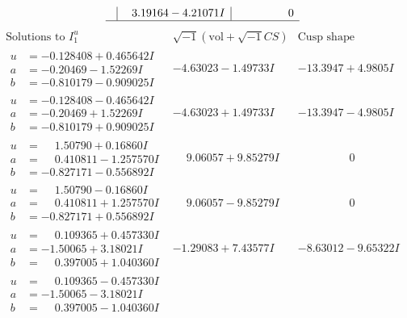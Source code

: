 \documentclass[1p]{elsarticle_modified}
\theoremstyle{definition}
\newcommand{\I}{\sqrt{-1}}
\begin{document}
$$\begin{array}{c|c|c}
 & \phantom{-}3.19164 - 4.21071 I & \phantom{-0.000000 } 0\\
 \hline 
 \end{array}$$\newpage$$\begin{array}{c|c|c}  
\text{Solutions to }I^u_{1}& \I (\text{vol} + \sqrt{-1}CS) & \text{Cusp shape}\\
 \hline 
\begin{aligned}
u &= -0.128408 + 0.465642 I \\
a &= -0.20469 - 1.52269 I \\
b &= -0.810179 - 0.909025 I\end{aligned}
 & -4.63023 - 1.49733 I & -13.3947 + 4.9805 I \\ \hline\begin{aligned}
u &= -0.128408 - 0.465642 I \\
a &= -0.20469 + 1.52269 I \\
b &= -0.810179 + 0.909025 I\end{aligned}
 & -4.63023 + 1.49733 I & -13.3947 - 4.9805 I \\ \hline\begin{aligned}
u &= \phantom{-}1.50790 + 0.16860 I \\
a &= \phantom{-}0.410811 - 1.257570 I \\
b &= -0.827171 - 0.556892 I\end{aligned}
 & \phantom{-}9.06057 + 9.85279 I & \phantom{-0.000000 } 0 \\ \hline\begin{aligned}
u &= \phantom{-}1.50790 - 0.16860 I \\
a &= \phantom{-}0.410811 + 1.257570 I \\
b &= -0.827171 + 0.556892 I\end{aligned}
 & \phantom{-}9.06057 - 9.85279 I & \phantom{-0.000000 } 0 \\ \hline\begin{aligned}
u &= \phantom{-}0.109365 + 0.457330 I \\
a &= -1.50065 + 3.18021 I \\
b &= \phantom{-}0.397005 + 1.040360 I\end{aligned}
 & -1.29083 + 7.43577 I & -8.63012 - 9.65322 I \\ \hline\begin{aligned}
u &= \phantom{-}0.109365 - 0.457330 I \\
a &= -1.50065 - 3.18021 I \\
b &= \phantom{-}0.397005 - 1.040360 I\end{aligned}

\end{array}$$
\end{document}
